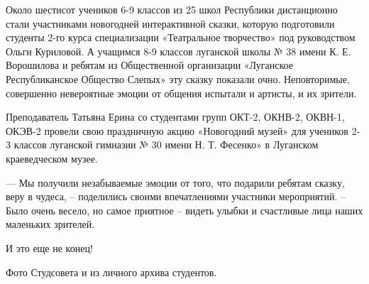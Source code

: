 Около шестисот учеников 6-9 классов из 25 школ Республики дистанционно стали
участниками новогодней интерактивной сказки, которую подготовили студенты 2-го
курса специализации «Театральное творчество» под руководством Ольги Куриловой.
А учащимся 8-9 классов луганской школы № 38 имени К. Е. Ворошилова и ребятам из
Общественной организации «Луганское Республиканское Общество Слепых» эту сказку
показали очно. Неповторимые, совершенно невероятные эмоции от общения испытали
и артисты, и их зрители.

Преподаватель Татьяна Ерина со студентами групп ОКТ-2, ОКНВ-2, ОКВН-1, ОКЭВ-2
провели свою праздничную акцию «Новогодний музей» для учеников 2-3 классов
луганской гимназии № 30 имени Н. Т. Фесенко» в Луганском краеведческом музее.

— Мы получили незабываемые эмоции от того, что подарили ребятам сказку, веру в
чудеса, – поделились своими впечатлениями участники мероприятий. – Было очень
весело, но самое приятное – видеть улыбки и счастливые лица наших маленьких
зрителей.

И это еще не конец!

Фото Студсовета и из личного архива студентов.

